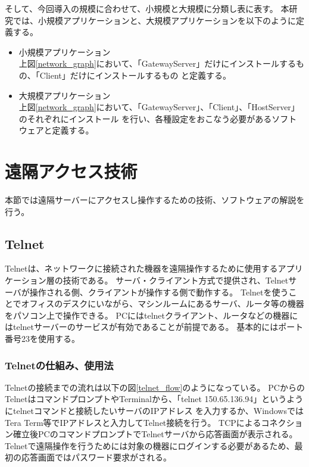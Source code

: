 \documentclass[12pt,a4paper,titlepage]{jsarticle}
\begin{document}
そして、今回導入の規模に合わせて、小規模と大規模に分類し表に表す。
本研究では、小規模アプリケーションと、大規模アプリケーションを以下のように定義する。
\begin{itemize}
    \item 小規模アプリケーション\mbox{}\\
    上図\ref{network_graph}において、「GatewayServer」だけにインストールするもの、「Client」だけにインストールするもの
    と定義する。
    \item 大規模アプリケーション\mbox{}\\
    上図\ref{network_graph}において、「GatewayServer」、「Client」、「HostServer」のそれぞれにインストール
    を行い、各種設定をおこなう必要があるソフトウェアと定義する。


\end{itemize}



\section{遠隔アクセス技術}
本節では遠隔サーバーにアクセスし操作するための技術、ソフトウェアの解説を行う。

\subsection{Telnet}
Telnetは、ネットワークに接続された機器を遠隔操作するために使用するアプリケーション層の技術である。
サーバ・クライアント方式で提供され、Telnetサーバが操作される側、クライアントが操作する側で動作する。
Telnetを使うことでオフィスのデスクにいながら、マシンルームにあるサーバ、ルータ等の機器をパソコン上で操作できる。
PCにはtelnetクライアント、ルータなどの機器にはtelnetサーバーのサービスが有効であることが前提である。
基本的にはポート番号23を使用する。


\subsubsection{Telnetの仕組み、使用法}
Telnetの接続までの流れは以下の図\ref{telnet_flow}のようになっている。
PCからのTelnetはコマンドプロンプトやTerminalから、「telnet 150.65.136.94」というようにtelnetコマンドと接続したいサーバのIPアドレス
を入力するか、WindowsではTera Term等でIPアドレスと入力してTelnet接続を行う。
TCPによるコネクション確立後PCのコマンドプロンプトでTelnetサーバから応答画面が表示される。
Telnetで遠隔操作を行うためには対象の機器にログインする必要があるため、最初の応答画面ではパスワード要求がされる。
\end{document}
